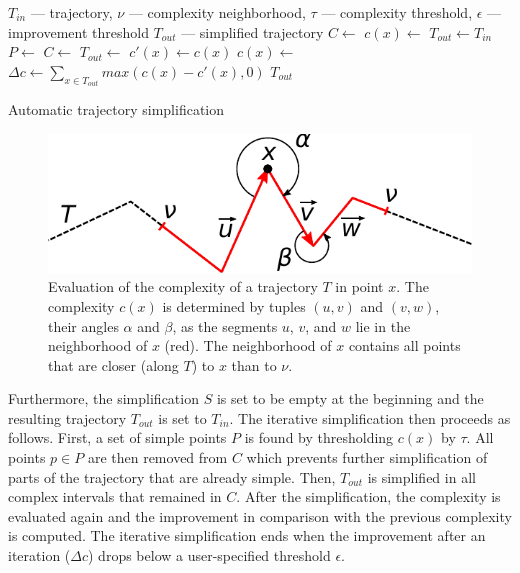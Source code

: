 \begin{algorithm} [htb]
  \begin{algorithmic}[1]
	  \Require $T_{in}$ --- trajectory, $\nu$ --- complexity neighborhood, $\tau$ --- complexity threshold, $\epsilon$ --- improvement threshold
	  \Ensure $T_{out}$ --- simplified trajectory
			\State $C \gets$  
			\State $c(x) \gets$ 
			\State
			\State $T_{out} \gets T_{in}$
			\Repeat
			  \State $P \gets$ 
				\State $C \gets$ 
			  \State
					\State $T_{out} \gets$ 
			  \EndFor
				\State
				\State $c'(x) \gets c(x)$ %
				\State $c(x) \gets$ 
				\State
				\State $\Delta c \gets \sum_{x \in T_{out}}{max(c(x) - c'(x), 0)}$
				\State {}
			\State
			\State \Return $T_{out}$
		\EndProcedure
  \end{algorithmic}
	\caption{Automatic trajectory simplification}
  \label{alg:auto-simplify}
\end{algorithm}

\begin{figure}
	\includegraphics[width=0.95\linewidth]{img/complexity.pdf}
\caption{Evaluation of the complexity of a trajectory $T$ in point $x$.
The complexity $c(x)$ is determined by tuples $(u, v)$ and $(v, w)$, \ie their angles $\alpha$ and $\beta$, as the segments $u$, $v$, and $w$ lie in the neighborhood of $x$ (red).
The neighborhood of $x$ contains all points that are closer (along $T$) to $x$ than to $\nu$.}
\label{fig:complexity}
\end{figure}

Furthermore, the simplification $S$ is set to be empty at the beginning and the resulting trajectory $T_{out}$ is set to $T_{in}$.
The iterative simplification then proceeds as follows.
First, a set of simple points $P$ is found by thresholding $c(x)$ by $\tau$.
All points $p \in P$ are then removed from $C$ which prevents further simplification of parts of the trajectory that are already simple.
Then, $T_{out}$ is simplified in all complex intervals that remained in $C$.
After the simplification, the complexity is evaluated again and the improvement in comparison with the previous complexity is computed.
The iterative simplification ends when the improvement after an iteration ($\Delta c$) drops below a user-specified threshold $\epsilon$.